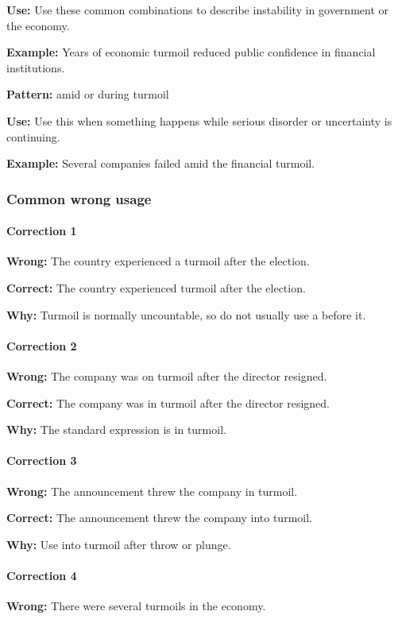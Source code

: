 \documentclass[11pt]{article}
\begin{document}
\textbf{Use:} Use these common combinations to describe instability in government or the economy.

\textbf{Example:} Years of economic turmoil reduced public confidence in financial institutions.

\textbf{Pattern:} amid or during turmoil

\textbf{Use:} Use this when something happens while serious disorder or uncertainty is continuing.

\textbf{Example:} Several companies failed amid the financial turmoil.

\subsubsection{Common wrong usage}
\paragraph{Correction 1}
\textbf{Wrong:} The country experienced a turmoil after the election.

\textbf{Correct:} The country experienced turmoil after the election.

\textbf{Why:} Turmoil is normally uncountable, so do not usually use a before it.

\paragraph{Correction 2}
\textbf{Wrong:} The company was on turmoil after the director resigned.

\textbf{Correct:} The company was in turmoil after the director resigned.

\textbf{Why:} The standard expression is in turmoil.

\paragraph{Correction 3}
\textbf{Wrong:} The announcement threw the company in turmoil.

\textbf{Correct:} The announcement threw the company into turmoil.

\textbf{Why:} Use into turmoil after throw or plunge.

\paragraph{Correction 4}
\textbf{Wrong:} There were several turmoils in the economy.
\end{document}
